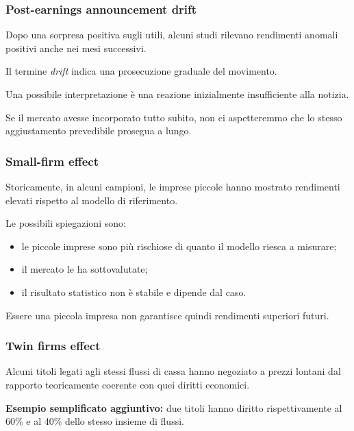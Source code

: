 \subsubsection*{Post-earnings announcement drift}

\noindent Dopo una sorpresa positiva sugli utili,
alcuni studi rilevano rendimenti anomali positivi
anche nei mesi successivi.

\noindent Il termine \textit{drift}
indica una prosecuzione graduale del movimento.

\medskip

\noindent Una possibile interpretazione
è una reazione inizialmente insufficiente
alla notizia.

\noindent Se il mercato avesse incorporato
tutto subito, non ci aspetteremmo
che lo stesso aggiustamento prevedibile
prosegua a lungo.


\subsubsection*{Small-firm effect}

\noindent Storicamente, in alcuni campioni,
le imprese piccole hanno mostrato
rendimenti elevati rispetto
al modello di riferimento.

\noindent Le possibili spiegazioni sono:

\begin{itemize}
    \item le piccole imprese sono più rischiose
    di quanto il modello riesca a misurare;

    \item il mercato le ha sottovalutate;

    \item il risultato statistico
    non è stabile e dipende dal caso.
\end{itemize}

\noindent Essere una piccola impresa
non garantisce quindi rendimenti superiori futuri.


\subsubsection*{Twin firms effect}

\noindent Alcuni titoli legati agli stessi
flussi di cassa hanno negoziato
a prezzi lontani dal rapporto teoricamente
coerente con quei diritti economici.

\medskip

\noindent \textbf{Esempio semplificato aggiuntivo:}
due titoli hanno diritto rispettivamente
al 60\% e al 40\%
dello stesso insieme di flussi.

